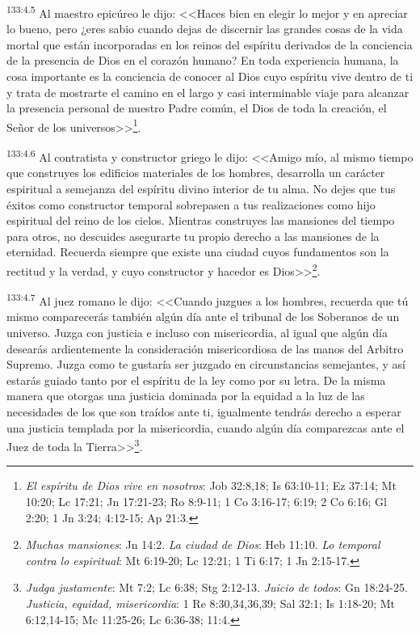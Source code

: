 \par 
\textsuperscript{133:4.5} Al maestro epicúreo le dijo: <<Haces bien en elegir lo mejor y en apreciar lo bueno, pero ¿eres sabio cuando dejas de discernir las grandes cosas de la vida mortal que están incorporadas en los reinos del espíritu derivados de la conciencia de la presencia de Dios en el corazón humano? En toda experiencia humana, la cosa importante es la conciencia de conocer al Dios cuyo espíritu vive dentro de ti y trata de mostrarte el camino en el largo y casi interminable viaje para alcanzar la presencia personal de nuestro Padre común, el Dios de toda la creación, el Señor de los universos>>\footnote{\textit{El espíritu de Dios vive en nosotros}: Job 32:8,18; Is 63:10-11; Ez 37:14; Mt 10:20; Lc 17:21; Jn 17:21-23; Ro 8:9-11; 1 Co 3:16-17; 6:19; 2 Co 6:16; Gl 2:20; 1 Jn 3:24; 4:12-15; Ap 21:3.}.

\par 
\textsuperscript{133:4.6} Al contratista y constructor griego le dijo: <<Amigo mío, al mismo tiempo que construyes los edificios materiales de los hombres, desarrolla un carácter espiritual a semejanza del espíritu divino interior de tu alma. No dejes que tus éxitos como constructor temporal sobrepasen a tus realizaciones como hijo espiritual del reino de los cielos. Mientras construyes las mansiones del tiempo para otros, no descuides asegurarte tu propio derecho a las mansiones de la eternidad. Recuerda siempre que existe una ciudad cuyos fundamentos son la rectitud y la verdad, y cuyo constructor y hacedor es Dios>>\footnote{\textit{Muchas mansiones}: Jn 14:2. \textit{La ciudad de Dios}: Heb 11:10. \textit{Lo temporal contra lo espiritual}: Mt 6:19-20; Lc 12:21; 1 Ti 6:17; 1 Jn 2:15-17.}.

\par 
\textsuperscript{133:4.7} Al juez romano le dijo: <<Cuando juzgues a los hombres, recuerda que tú mismo comparecerás también algún día ante el tribunal de los Soberanos de un universo. Juzga con justicia e incluso con misericordia, al igual que algún día desearás ardientemente la consideración misericordiosa de las manos del Arbitro Supremo. Juzga como te gustaría ser juzgado en circunstancias semejantes, y así estarás guiado tanto por el espíritu de la ley como por su letra. De la misma manera que otorgas una justicia dominada por la equidad a la luz de las necesidades de los que son traídos ante ti, igualmente tendrás derecho a esperar una justicia templada por la misericordia, cuando algún día comparezcas ante el Juez de toda la Tierra>>\footnote{\textit{Judga justamente}: Mt 7:2; Lc 6:38; Stg 2:12-13. \textit{Juicio de todos}: Gn 18:24-25. \textit{Justicia, equidad, misericordia}: 1 Re 8:30,34,36,39; Sal 32:1; Is 1:18-20; Mt 6:12,14-15; Mc 11:25-26; Lc 6:36-38; 11:4.}.

